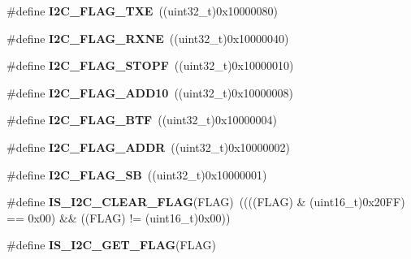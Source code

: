\begin{DoxyCompactItemize}
\item 
\hypertarget{group__I2C__flags__definition_gaeda14a3e9d02ff20a0d001bba9328f3d}{
\#define {\bfseries I2C\_\-FLAG\_\-TXE}~((uint32\_\-t)0x10000080)}
\label{group__I2C__flags__definition_gaeda14a3e9d02ff20a0d001bba9328f3d}

\item 
\hypertarget{group__I2C__flags__definition_gad53c5b70a186f699f187c7a641ab0dac}{
\#define {\bfseries I2C\_\-FLAG\_\-RXNE}~((uint32\_\-t)0x10000040)}
\label{group__I2C__flags__definition_gad53c5b70a186f699f187c7a641ab0dac}

\item 
\hypertarget{group__I2C__flags__definition_gacc7d993963e199a6ddba391dab8da896}{
\#define {\bfseries I2C\_\-FLAG\_\-STOPF}~((uint32\_\-t)0x10000010)}
\label{group__I2C__flags__definition_gacc7d993963e199a6ddba391dab8da896}

\item 
\hypertarget{group__I2C__flags__definition_ga316c78cbf34b74da96d69f702a0d1444}{
\#define {\bfseries I2C\_\-FLAG\_\-ADD10}~((uint32\_\-t)0x10000008)}
\label{group__I2C__flags__definition_ga316c78cbf34b74da96d69f702a0d1444}

\item 
\hypertarget{group__I2C__flags__definition_ga4dc3d44342007a5cd21c3baa0d938606}{
\#define {\bfseries I2C\_\-FLAG\_\-BTF}~((uint32\_\-t)0x10000004)}
\label{group__I2C__flags__definition_ga4dc3d44342007a5cd21c3baa0d938606}

\item 
\hypertarget{group__I2C__flags__definition_ga5472d1196e934e0cc471aba8f66af416}{
\#define {\bfseries I2C\_\-FLAG\_\-ADDR}~((uint32\_\-t)0x10000002)}
\label{group__I2C__flags__definition_ga5472d1196e934e0cc471aba8f66af416}

\item 
\hypertarget{group__I2C__flags__definition_gae009ab84be03fcc438625b1c39376ad4}{
\#define {\bfseries I2C\_\-FLAG\_\-SB}~((uint32\_\-t)0x10000001)}
\label{group__I2C__flags__definition_gae009ab84be03fcc438625b1c39376ad4}

\item 
\hypertarget{group__I2C__flags__definition_ga66c8180841350c47627c323acfe42ee9}{
\#define {\bfseries IS\_\-I2C\_\-CLEAR\_\-FLAG}(FLAG)~((((FLAG) \& (uint16\_\-t)0x20FF) == 0x00) \&\& ((FLAG) != (uint16\_\-t)0x00))}
\label{group__I2C__flags__definition_ga66c8180841350c47627c323acfe42ee9}

\item 
\#define {\bfseries IS\_\-I2C\_\-GET\_\-FLAG}(FLAG)
\end{DoxyCompactItemize}


